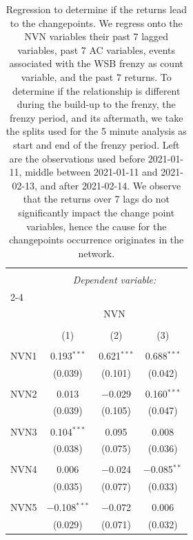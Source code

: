 
\begin{table}[!htbp] \centering 
  \caption{Regression to determine if the returns lead to the changepoints. We regress 
onto the NVN variables their past 7 lagged variables, past 7 AC variables, events associated with the WSB frenzy as count variable, and 
the past 7 returns. To determine if the relationship is different during the build-up to the frenzy, the frenzy period, and its aftermath, we 
take the splits used for the 5 minute analysis as start and end of the frenzy period. Left are the observations used before 2021-01-11, middle between 2021-01-11 and 2021-02-13, and after 
2021-02-14. We observe that the returns over 7 lags do not significantly impact the change point variables, 
hence the cause for the changepoints occurrence originates in the network.} 
  \label{NVN_reg_robust} 
\scriptsize 
\begin{tabular}{@{\extracolsep{5pt}}lccc} 
\\[-1.8ex]\hline 
\hline \\[-1.8ex] 
 & \multicolumn{3}{c}{\textit{Dependent variable:}} \\ 
\cline{2-4} 
\\[-1.8ex] & \multicolumn{3}{c}{NVN} \\ 
\\[-1.8ex] & (1) & (2) & (3)\\ 
\hline \\[-1.8ex] 
 NVN1 & 0.193$^{***}$ & 0.621$^{***}$ & 0.688$^{***}$ \\ 
  & (0.039) & (0.101) & (0.042) \\ 
  & & & \\ 
 NVN2 & 0.013 & $-$0.029 & 0.160$^{***}$ \\ 
  & (0.039) & (0.105) & (0.047) \\ 
  & & & \\ 
 NVN3 & 0.104$^{***}$ & 0.095 & 0.008 \\ 
  & (0.038) & (0.075) & (0.036) \\ 
  & & & \\ 
 NVN4 & 0.006 & $-$0.024 & $-$0.085$^{**}$ \\ 
  & (0.035) & (0.077) & (0.033) \\ 
  & & & \\ 
 NVN5 & $-$0.108$^{***}$ & $-$0.072 & 0.006 \\ 
  & (0.029) & (0.071) & (0.032) \\ 

\end{tabular}
\end{table}
